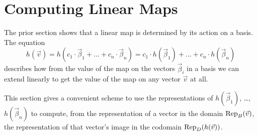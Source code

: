 \section{Computing Linear Maps}
The prior section shows that
a linear map is determined by its action on a basis.
The equation
\begin{equation*}
  h(\vec{v})
  =h(c_1\cdot\vec{\beta}_1+\dots+c_n\cdot\vec{\beta}_n)
  =c_1\cdot h(\vec{\beta}_1)+\dots +c_n\cdot h(\vec{\beta}_n)
\tag*{}\end{equation*}
describes how
from the value of the map on the vectors $\vec{\beta}_i$ in a basis we
can extend linearly to 
get the value of the map on any vector $\vec{v}$ at all.

This section gives a convenient scheme
to use the representations of 
\( h(\vec{\beta}_1) \), \ldots, \( h(\vec{\beta}_n) \)
to compute, from the representation of a vector in the domain 
$\rep{\vec{v}}{B}$,
the representation of that vector's image in the codomain 
$\rep{h(\vec{v})}{D}$.














